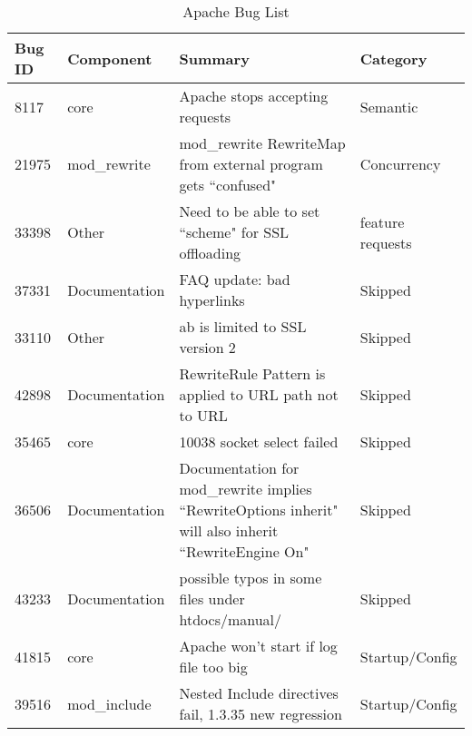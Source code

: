 \begin{longtable}[c]{llll}
\caption{Apache Bug List}
\label{tab:apachebuglist}\\
Bug ID & Component          & Summary                                                                                                        & Category          \\
\endfirsthead
%
\endhead
%

8117   & core               & Apache stops accepting requests                                                                                & Semantic          \\
21975  & mod\_rewrite       & mod\_rewrite RewriteMap from external program gets ``confused"                                                  & Concurrency       \\
33398  & Other              & Need to be able to set ``scheme" for SSL offloading                                                             & feature requests  \\
37331  & Documentation      & FAQ update: bad hyperlinks                                                                                     & Skipped           \\
33110  & Other              & ab is limited to SSL version 2                                                                                 & Skipped           \\
42898  & Documentation      & RewriteRule Pattern  is applied to URL path not to URL                                                         & Skipped           \\
35465  & core               & 10038 socket select failed                                                                                     & Skipped           \\
36506  & Documentation      & Documentation for mod\_rewrite implies ``RewriteOptions inherit" will also inherit ``RewriteEngine On"           & Skipped           \\
43233  & Documentation      & possible typos in some files under htdocs/manual/                                                              & Skipped           \\
41815  & core               & Apache won't start if log file too big                                                                         & Startup/Config    \\
39516  & mod\_include       & Nested Include directives fail, 1.3.35 new regression                                                          & Startup/Config    \\

\end{longtable}
